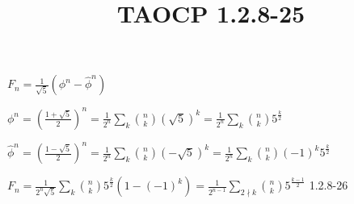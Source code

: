 \documentclass{article}
\title{TAOCP 1.2.8\mbox{-}25}
\begin{document}
\maketitle

\( F_{n} = \frac{1}{\sqrt{5}}(\phi^{n} - \hat{\phi}^{n}) \)

\( \phi^{n} = {(\frac{1+\sqrt{5}}{2})}^{n} = \frac{1}{2^{n}} \sum_{k} \binom{n}{k}{(\sqrt{5})}^{k} = \frac{1}{2^{n}} \sum_{k} \binom{n}{k} 5^{\frac{k}{2}} \)

\( \hat{\phi}^{n} = {(\frac{1-\sqrt{5}}{2})}^{n} = \frac{1}{2^{n}} \sum_{k} \binom{n}{k}{(-\sqrt{5})}^{k} = \frac{1}{2^{n}} \sum_{k} \binom{n}{k} {(-1)}^{k}5^{\frac{k}{2}} \)

\( F_{n} = \frac{1}{2^{n}\sqrt{5}}\sum_{k} \binom{n}{k}5^{\frac{k}{2}}(1-{(-1)}^{k}) = \frac{1}{2^{n-1}} \sum_{2 \nmid k} \binom{n}{k}5^{\frac{k-1}{2}} \)
1.2.8\mbox{-}26
\end{document}
